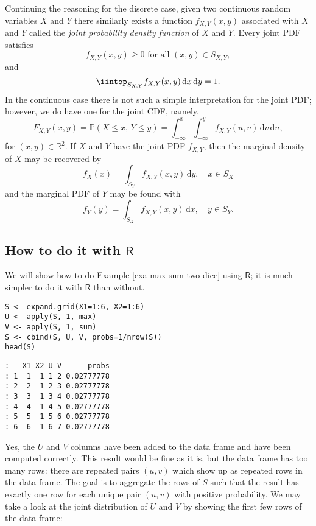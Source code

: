 Continuing the reasoning for the discrete case, given two continuous
random variables \(X\) and \(Y\) there similarly
exists a function \(f_{X,Y}(x,y)\) associated with
\(X\) and \(Y\) called the \emph{joint probability density function} of
\(X\) and \(Y\). Every joint PDF satisfies
\begin{equation}
f_{X,Y}(x,y)\geq0\mbox{ for all }(x,y)\in S_{X,Y},
\end{equation}
and
\begin{equation}
\iintop_{S_{X,Y}}f_{X,Y}(x,y)\,\mathrm{d} x\,\mathrm{d} y=1.
\end{equation}
In the continuous case there is not such a simple interpretation for
the joint PDF; however, we do have one for the joint CDF, namely, \[
F_{X,Y}(x,y)=\mathbb{P}(X\leq x,\, Y\leq
y)=\int_{-\infty}^{x}\int_{-\infty}^{y}f_{X,Y}(u,v)\,\mathrm{d}
v\,\mathrm{d} u, \] for \((x,y)\in\mathbb{R}^{2}\). If \(X\) and \(Y\)
have the joint PDF \(f_{X,Y}\), then the marginal density of \(X\) may
be recovered by
\begin{equation}
f_{X}(x)=\int_{S_{Y}}f_{X,Y}(x,y)\,\mathrm{d} y,\quad x \in S_{X}
\end{equation}
and the marginal PDF of \(Y\) may be found with
\begin{equation}
f_{Y}(y)=\int_{S_{X}}f_{X,Y}(x,y)\,\mathrm{d} x, \quad y \in S_{Y}.
\end{equation}

\subsection{How to do it with \(\mathsf{R}\)}
\label{sec-7-1-1}

We will show how to do Example \ref{exa-max-sum-two-dice} using \(\mathsf{R}\);
it is much simpler to do it with \(\mathsf{R}\) than without.

\begin{Verbatim}
S <- expand.grid(X1=1:6, X2=1:6)
U <- apply(S, 1, max)
V <- apply(S, 1, sum)
S <- cbind(S, U, V, probs=1/nrow(S))
head(S)
\end{Verbatim}

\begin{verbatim}
:   X1 X2 U V      probs
: 1  1  1 1 2 0.02777778
: 2  2  1 2 3 0.02777778
: 3  3  1 3 4 0.02777778
: 4  4  1 4 5 0.02777778
: 5  5  1 5 6 0.02777778
: 6  6  1 6 7 0.02777778
\end{verbatim}

Yes, the \(U\) and \(V\) columns have been added to the data frame and
have been computed correctly. This result would be fine as it is, but
the data frame has too many rows: there are repeated pairs \((u,v)\)
which show up as repeated rows in the data frame. The goal is to
aggregate the rows of \(S\) such that the result has exactly one row
for each unique pair \((u,v)\) with positive probability.
We may take a look at the joint distribution of \(U\) and
\(V\) by showing the first few rows of the data frame:

